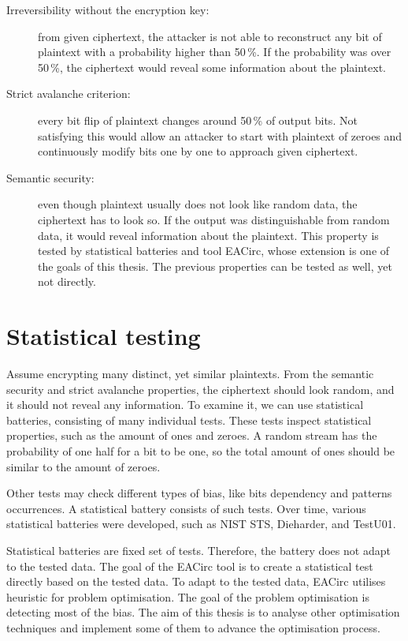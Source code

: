 \documentclass[
  print, %
  Table,   %
  nolof,     %
  nolot,     %
  11pt, %
  oneside  %
]{fithesis3}
\begin{document}
\begin{description}
    \item[Irreversibility without the encryption key:] from given ciphertext, the attacker is not able to reconstruct any bit of plaintext with a probability higher than 50\,\%. If the probability was over 50\,\%, the ciphertext would reveal some information about the plaintext.

    \item[Strict avalanche criterion:] every bit flip of plaintext changes around 50\,\% of output bits. Not satisfying this would allow an attacker to start with plaintext of zeroes and continuously modify bits one by one to approach given ciphertext.

    \item[Semantic security:] even though plaintext usually does not look like random data, the ciphertext has to look so. If the output was distinguishable from random data, it would reveal information about the plaintext. This property is tested by statistical batteries and tool EACirc, whose extension is one of the goals of this thesis. The previous properties can be tested as well, yet not directly.
\end{description}


\section{Statistical testing}
\label{sec:stat-testing}

Assume encrypting many distinct, yet similar plaintexts. From the semantic security and strict avalanche properties, the ciphertext should look random, and it should not reveal any information. To examine it, we can use statistical batteries, consisting of many individual tests. These tests inspect statistical properties, such as the amount of ones and zeroes. A random stream has the probability of one half for a bit to be one, so the total amount of ones should be similar to the amount of zeroes.

Other tests may check different types of bias, like bits dependency and patterns occurrences. A statistical battery consists of such tests. Over time, various statistical batteries were developed, such as NIST STS, Dieharder, and TestU01.

Statistical batteries are fixed set of tests. Therefore, the battery does not adapt to the tested data. The goal of the EACirc tool is to create a statistical test directly based on the tested data. To adapt to the tested data, EACirc utilises heuristic for problem optimisation. The goal of the problem optimisation is detecting most of the bias. The aim of this thesis is to analyse other optimisation techniques and implement some of them to advance the optimisation process.
\end{document}
